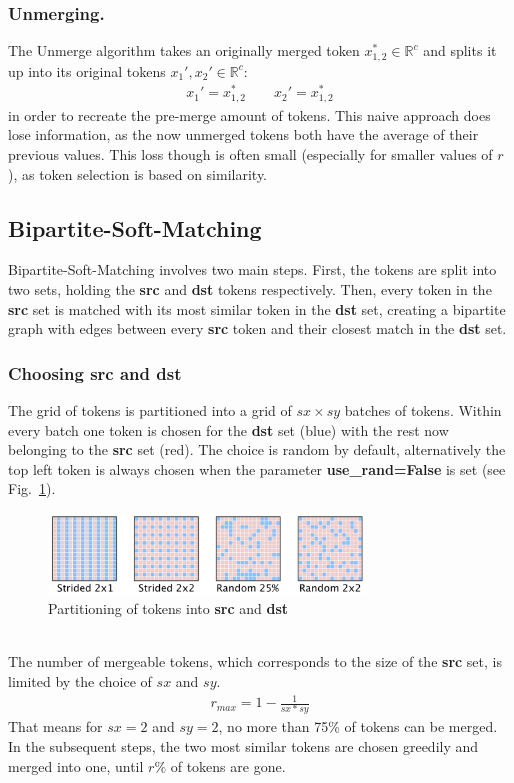\subsubsection*{Unmerging.} The Unmerge algorithm takes an originally merged token $x_{1,2}^* \in \mathbb{R}^c$ and splits it up into its original tokens $x_1', x_2' \in \mathbb{R}^c$: 
\begin{align*}
    x_1' = x_{1,2}^* \quad\quad
    x_2' = x_{1,2}^*
\end{align*}
in order to recreate the pre-merge amount of tokens.
This naive approach does lose information, as the now unmerged tokens both have the average of their previous values. This loss though is often small (especially for smaller values of \(r\)), as token selection is based on similarity.



\subsection{Bipartite-Soft-Matching}
Bipartite-Soft-Matching involves two main steps. First, the tokens are split into two sets, holding the \textbf{src} and \textbf{dst} tokens respectively. Then, every token in the \textbf{src} set is matched with its most similar token in the \textbf{dst} set, creating a bipartite graph with edges between every \textbf{src} token and their closest match in the \textbf{dst} set. 



\subsubsection*{Choosing src and dst}
The grid of tokens is partitioned into a grid of \(sx \times sy\) batches of tokens.
Within every batch one token is chosen for the \textbf{dst} set (blue) with the rest now belonging to the \textbf{src} set (red). The choice is random by default, alternatively the top left token is always chosen when the parameter \textbf{use\_rand=False} is set (see Fig.~\ref{fig:src-dst}).
\begin{figure}[!htb]
\centering
\includegraphics[width=0.75\textwidth]
{static/src_dst_part.png}
\caption{Partitioning of tokens into \textbf{src} and \textbf{dst} \cite[Fig. 5]{bolya2023tome}}
\label{fig:src-dst}
\end{figure}\\
The number of mergeable tokens, which corresponds to the size of the \textbf{src} set, is limited by the choice of \(sx\) and \(sy\).
\begin{align*}
    r_{max} = 1-\frac{1}{sx*sy}
\end{align*}
That means for \(sx = 2\) and \(sy = 2\), no more than 75\% of tokens can be merged.\\
In the subsequent steps, the two most similar tokens are chosen greedily and merged into one, until \(r\%\) of tokens are gone.



